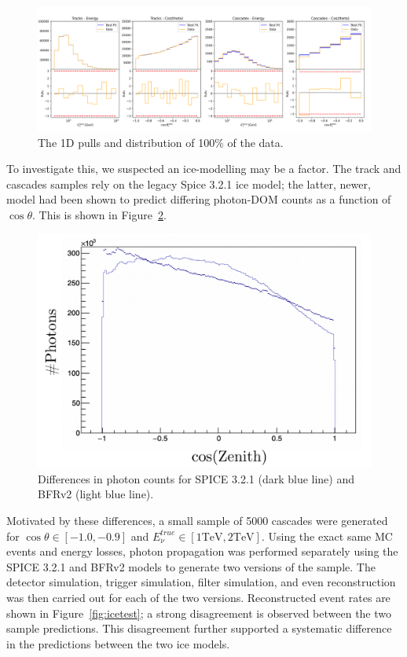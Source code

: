 \documentclass[main.tex]{subfiles}
\begin{document}
\begin{figure}
    \centering
    \includegraphics[width=0.9\linewidth]{./figures/goodness_joint_data_full_IC86_data_full.png}
    \caption{The 1D pulls and distribution of 100\% of the data.}\label{fig:1d_100p_distrib}
\end{figure}


To investigate this, we suspected an ice-modelling may be a factor. 
The track and cascades samples rely on the legacy Spice 3.2.1 ice model; the latter, newer, model had been shown to predict differing photon-DOM counts as a function of $\cos\theta$.  
This is shown in Figure~\ref{fig:zenith_bfr}.

\begin{figure}
    \centering
    \includegraphics[width=0.9\linewidth]{./figures/ice_investigate/zenith_bfr.png}
    \caption{Differences in photon counts for SPICE 3.2.1 (dark blue line) and BFRv2 (light blue line).}\label{fig:zenith_bfr}
\end{figure}

Motivated by these differences, a small sample of 5000 cascades were generated for $\cos\theta\in\left[-1.0, -0.9\right]$ and $E_{\nu}^{true}\in\left[1\text{TeV}, 2\text{TeV}\right]$. 
Using the exact same MC events and energy losses, photon propagation was performed separately using the SPICE 3.2.1 and BFRv2 models to generate two versions of the sample.
The detector simulation, trigger simulation, filter simulation, and even reconstruction was then carried out for each of the two versions. 
Reconstructed event rates are shown in Figure~\ref{fig:icetest}; a strong disagreement is observed between the two sample predictions. 
This disagreement further supported a systematic difference in the predictions between the two ice models. 
\end{document}
